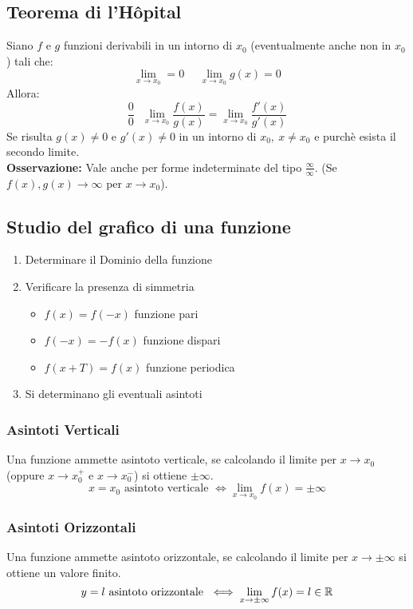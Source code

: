 \documentclass[../../main.tex]{subfiles}
\begin{document}
\subsection{Teorema di l'Hôpital}
Siano $f$ e $g$ funzioni derivabili in un intorno di $x_0$ (eventualmente anche non in $x_0$) tali che:
\[
    \lim_{x\to x_0} = 0 \ \ \ \ \ \ \lim_{x\to x_0}g(x) = 0
\]
Allora:
\[
    \frac{0}{0} \ \ \ \lim_{x\to x_0}\frac{f(x)}{g(x)} = \lim_{x\to x_0}\frac{f'(x)}{g'(x)}
\]
Se risulta $g(x) \neq 0$ e $g'(x) \neq 0$ in un intorno di $x_0, \ x\neq x_0$ e purchè esista il secondo limite.\\
\textbf{Osservazione:} Vale anche per forme indeterminate del tipo $\frac{\infty}{\infty}$. (Se $f(x), g(x) \to \infty$ per $x\to x_0$).
\subsection{Studio del grafico di una funzione}
\begin{enumerate}
    \item Determinare il Dominio della funzione
    \item Verificare la presenza di simmetria
          \begin{itemize}
              \item $f(x) = f(-x)$ funzione pari
              \item $f(-x) = -f(x)$ funzione dispari
              \item $f(x+T) = f(x)$ funzione periodica
          \end{itemize}
    \item Si determinano gli eventuali asintoti
\end{enumerate}

\subsubsection{Asintoti Verticali}
Una funzione ammette asintoto verticale, se calcolando il limite per $x\to x_0$ (oppure $x\to x_0^+$ e $x\to x_0^-$) si ottiene $\pm\infty$.
\[
    x = x_0 \text{ asintoto verticale } \iff \lim_{x\to x_0}f(x) = \pm\infty
\]
\subsubsection{Asintoti Orizzontali}
Una funzione ammette asintoto orizzontale, se calcolando il limite per $x\to\pm\infty$ si ottiene un valore finito.
\[
    y = l \text{ asintoto orizzontale } \iff \lim_{x\to\pm\infty}f(x) = l \in \mathbb{R}
\]
\end{document}
